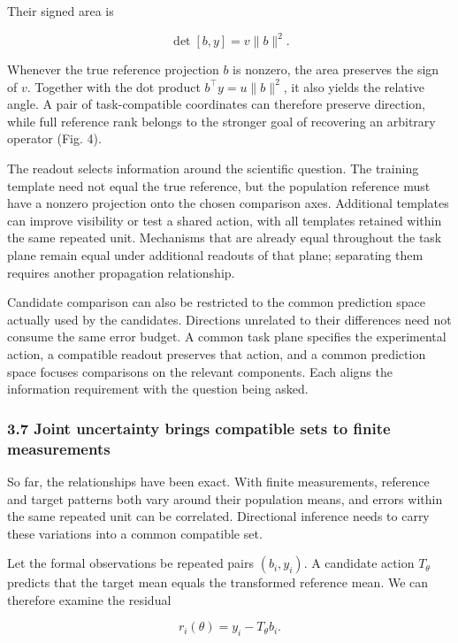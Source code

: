 \documentclass[11pt,a4paper]{article}
\begin{document}
\par
\noindent\begin{minipage}{\linewidth}

Their signed area is

\[
\det[b,y]=v\|b\|^2.
\]

\end{minipage}\par

Whenever the true reference projection \(b\) is nonzero, the area
preserves the sign of \(v\). Together with the dot product
\(b^\top y=u\|b\|^2\), it also yields the relative angle. A pair of
task-compatible coordinates can therefore preserve direction, while full
reference rank belongs to the stronger goal of recovering an arbitrary
operator (Fig. 4).

The readout selects information around the scientific question. The
training template need not equal the true reference, but the population
reference must have a nonzero projection onto the chosen comparison
axes. Additional templates can improve visibility or test a shared
action, with all templates retained within the same repeated unit.
Mechanisms that are already equal throughout the task plane remain equal
under additional readouts of that plane; separating them requires
another propagation relationship.

Candidate comparison can also be restricted to the common prediction
space actually used by the candidates. Directions unrelated to their
differences need not consume the same error budget. A common task plane
specifies the experimental action, a compatible readout preserves that
action, and a common prediction space focuses comparisons on the
relevant components. Each aligns the information requirement with the
question being asked.

\subsubsection{3.7 Joint uncertainty brings compatible sets to finite
measurements}\label{joint-uncertainty-brings-compatible-sets-to-finite-measurements}

So far, the relationships have been exact. With finite measurements,
reference and target patterns both vary around their population means,
and errors within the same repeated unit can be correlated. Directional
inference needs to carry these variations into a common compatible set.

\par
\noindent\begin{minipage}{\linewidth}

Let the formal observations be repeated pairs \((b_i,y_i)\). A candidate
action \(T_\theta\) predicts that the target mean equals the transformed
reference mean. We can therefore examine the residual

\[
r_i(\theta)=y_i-T_\theta b_i.
\]

\end{minipage}\par
\end{document}

